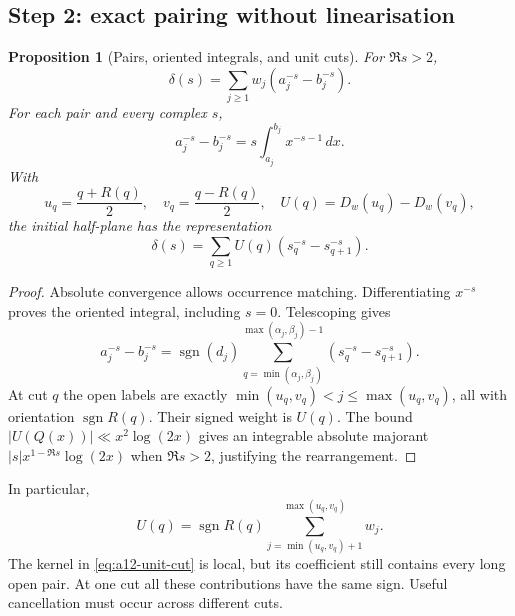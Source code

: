 \documentclass[11pt]{amsart}
\numberwithin{equation}{section}
\theoremstyle{plain}
\newtheorem{proposition}[theorem]{Proposition}
\theoremstyle{definition}
\theoremstyle{remark}
\begin{document}
\subsection{Step 2: exact pairing without linearisation}
\label{subsec:a12-exact-pairing}
\begin{proposition}[Pairs, oriented integrals, and unit cuts]
\label{prop:a12-exact-pairing}
For $\Re s>2$,
\begin{equation}
\label{eq:a12-delta-pairs}
\delta(s)=\sum_{j\ge1}w_j(a_j^{-s}-b_j^{-s}).
\end{equation}
For each pair and every complex $s$,
\begin{equation}
\label{eq:a12-exact-integral}
a_j^{-s}-b_j^{-s}=s\int_{a_j}^{b_j}x^{-s-1}\,dx.
\end{equation}
With
\begin{equation}
\label{eq:a12-U}
u_q=\frac{q+R(q)}2,\quad v_q=\frac{q-R(q)}2,\quad
U(q)=D_w(u_q)-D_w(v_q),
\end{equation}
the initial half-plane has the representation
\begin{equation}
\label{eq:a12-unit-cut}
\boxed{\delta(s)=\sum_{q\ge1}U(q)(s_q^{-s}-s_{q+1}^{-s}).}
\end{equation}
\end{proposition}
\begin{proof}
Absolute convergence allows occurrence matching.
Differentiating $x^{-s}$ proves the oriented integral, including $s=0$.
Telescoping gives
\begin{equation}
\label{eq:a12-telescope}
a_j^{-s}-b_j^{-s}=\operatorname{sgn}(d_j)
\sum_{q=\min(\alpha_j,\beta_j)}^{\max(\alpha_j,\beta_j)-1}
(s_q^{-s}-s_{q+1}^{-s}).
\end{equation}
At cut $q$ the open labels are exactly
$\min(u_q,v_q)<j\le\max(u_q,v_q)$, all with orientation
$\operatorname{sgn}R(q)$. Their signed weight is $U(q)$.
The bound $|U(Q(x))|\ll x^2\log(2x)$ gives an integrable absolute majorant
$|s|x^{1-\Re s}\log(2x)$ when $\Re s>2$, justifying the rearrangement.
\end{proof}
In particular,
\begin{equation}
\label{eq:a12-U-block}
U(q)=\operatorname{sgn}R(q)
\sum_{j=\min(u_q,v_q)+1}^{\max(u_q,v_q)}w_j.
\end{equation}
The kernel in \eqref{eq:a12-unit-cut} is local, but its coefficient still
contains every long open pair. At one cut all these contributions have the
same sign. Useful cancellation must occur across different cuts.
\end{document}
